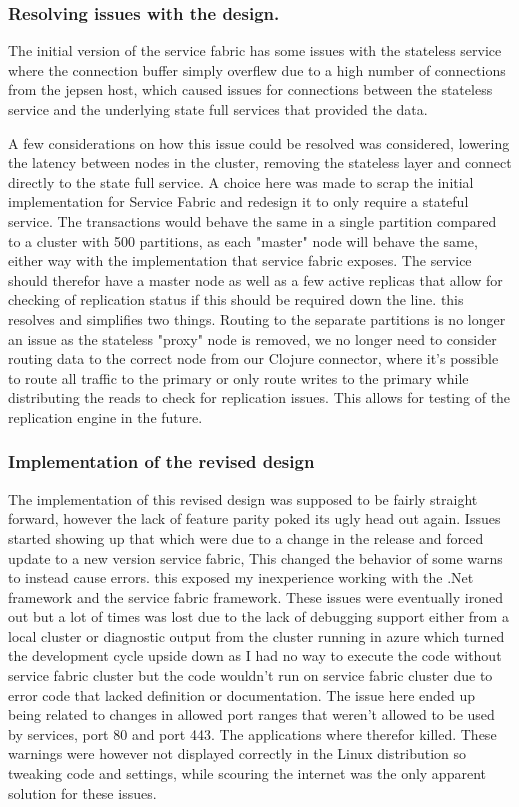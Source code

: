 \documentclass[a4paper,10pt,titlepage]{report}
\begin{document}
\subsubsection{Resolving issues with the design.}
    

The initial version of the service fabric has some issues with the stateless service where the connection buffer simply overflew due to a high number of connections from the jepsen host, which caused issues for connections between the stateless service and the underlying state full services that provided the data.

A few considerations on how this issue could be resolved was considered, lowering the latency between nodes in the cluster, removing the stateless layer and connect directly to the state full service. A choice here was made to scrap the initial implementation for Service Fabric and redesign it to only require a stateful service. The transactions would behave the same in a  single partition compared to a cluster with 500 partitions, as each "master" node will behave the same, either way with the implementation that service fabric exposes. The service should therefor have a master node as well as a few active replicas that allow for checking of replication status if this should be required down the line. this resolves and simplifies two things. Routing to the separate partitions is no longer an issue as the stateless "proxy" node is removed, we no longer need to consider routing data to the correct node from our Clojure connector, where it's possible to route all traffic to the primary or only route writes to the primary while distributing the reads to check for replication issues. This allows for testing of the replication engine in the future.

 \subsubsection{Implementation of the revised design}

The implementation of this revised design was supposed to be fairly straight forward, however the lack of feature parity poked its ugly head out again. Issues started showing up that which were due to a change in the release and forced update to a new version service fabric, This changed the behavior of some warns to instead cause errors. this exposed my inexperience working with the .Net framework and the service fabric framework. These issues were eventually ironed out but a lot of times was lost due to the lack of debugging support either from a local cluster or diagnostic output from the cluster running in azure which turned the development cycle upside down as I had no way to execute the code without service fabric cluster but the code wouldn't run on service fabric cluster due to error code that lacked definition or documentation. The issue here ended up being related to changes in allowed port ranges that weren't allowed to be used by services, port 80 and port 443. The applications where therefor killed. These warnings were however not displayed correctly in the Linux distribution so tweaking code and settings, while scouring the internet was the only apparent solution for these issues.
\end{document}
